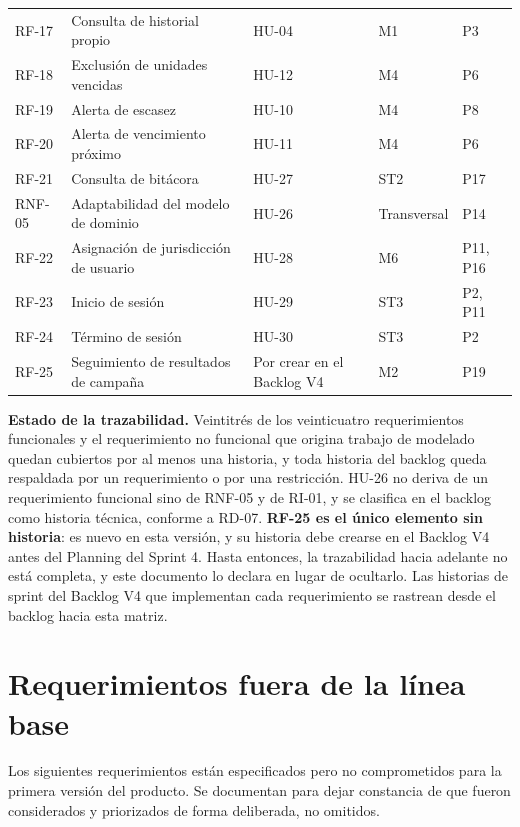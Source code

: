 \documentclass[11pt,a4paper]{article}
\begin{document}
\begin{longtable}{L{1.2cm} L{4.2cm} L{3.0cm} L{1.2cm} L{4.0cm}}
RF-17 & Consulta de historial propio & HU-04 & M1 & P3 \\
RF-18 & Exclusión de unidades vencidas & HU-12 & M4 & P6 \\
RF-19 & Alerta de escasez & HU-10 & M4 & P8 \\
RF-20 & Alerta de vencimiento próximo & HU-11 & M4 & P6 \\
RF-21 & Consulta de bitácora & HU-27 & ST2 & P17 \\
RNF-05 & Adaptabilidad del modelo de dominio & HU-26 & Transversal & P14 \\
RF-22 & Asignación de jurisdicción de usuario & HU-28 & M6 & P11, P16 \\
RF-23 & Inicio de sesión & HU-29 & ST3 & P2, P11 \\
RF-24 & Término de sesión & HU-30 & ST3 & P2 \\
RF-25 & Seguimiento de resultados de campaña & Por crear en el Backlog V4 & M2 & P19 \\
\end{longtable}

\vspace{0.2cm}
\noindent \textbf{Estado de la trazabilidad.} Veintitrés de los veinticuatro requerimientos funcionales y el requerimiento no funcional que origina trabajo de modelado quedan cubiertos por al menos una historia, y toda historia del backlog queda respaldada por un requerimiento o por una restricción. HU-26 no deriva de un requerimiento funcional sino de RNF-05 y de RI-01, y se clasifica en el backlog como historia técnica, conforme a RD-07. \textbf{RF-25 es el único elemento sin historia}: es nuevo en esta versión, y su historia debe crearse en el Backlog V4 antes del Planning del Sprint 4. Hasta entonces, la trazabilidad hacia adelante no está completa, y este documento lo declara en lugar de ocultarlo. Las historias de sprint del Backlog V4 que implementan cada requerimiento se rastrean desde el backlog hacia esta matriz.

\section{Requerimientos fuera de la línea base}
\label{sec:fuera}

Los siguientes requerimientos están especificados pero no comprometidos para la primera versión del producto. Se documentan para dejar constancia de que fueron considerados y priorizados de forma deliberada, no omitidos.
\end{document}
